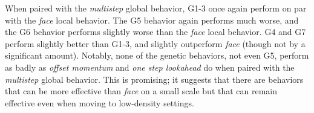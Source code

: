 When paired with the \textit{multistep} global behavior, G1-3 once again
perform on par with the \textit{face} local behavior.
The G5 behavior again performs much worse, and the G6 behavior performs slightly
worse than the \textit{face} local behavior.
G4 and G7 perform slightly better than G1-3, and slightly outperform \textit{face}
(though not by a significant amount).
Notably, none of the genetic behaviors, not even G5, perform as badly as \textit{
offset momentum} and \textit{one step lookahead} do when paired with the
\textit{multistep} global behavior.
This is promising; it suggests that there are behaviors that can be more effective
than \textit{face} on a small scale but that can remain effective even when moving
to low-density settings.




